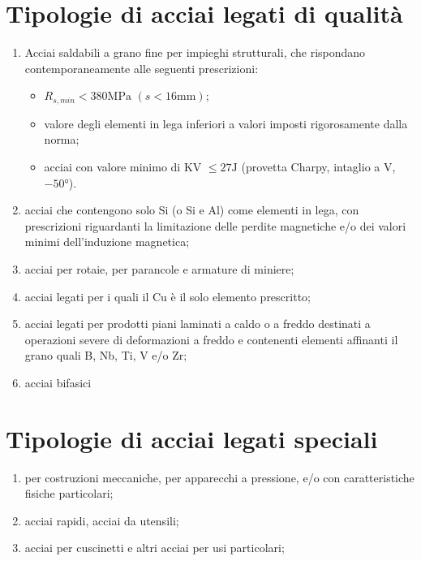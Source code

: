 \section{Tipologie di acciai legati di qualità}\label{sec:ALDQ}
\begin{enumerate}
\item Acciai saldabili a grano fine per impieghi strutturali, che rispondano contemporaneamente alle seguenti prescrizioni:
	\begin{itemize}
	\item $R_{s,min} < 380\unit{\MPa}$ $(s < 16\unit{\mm})$;
	\item valore degli elementi in lega inferiori a valori imposti rigorosamente dalla norma;
	\item acciai con valore minimo di KV $\leq 27\unit{\J}$ (provetta Charpy, intaglio a V, $-50\unit{\degree}$).
	\end{itemize}
\item acciai che contengono solo Si (o Si e Al) come elementi in lega, con prescrizioni riguardanti la limitazione delle perdite magnetiche e/o dei valori minimi dell'induzione magnetica;
\item acciai per rotaie, per parancole e armature di miniere;
\item acciai legati per i quali il Cu è il solo elemento prescritto;
\item acciai legati per prodotti piani laminati a caldo o a freddo destinati a operazioni severe di deformazioni a freddo e contenenti elementi affinanti il grano quali B, Nb, Ti, V e/o Zr;
\item acciai bifasici
\end{enumerate}

\section{Tipologie di acciai legati speciali}\label{sec:ALS}
\begin{enumerate}
\item per costruzioni meccaniche, per apparecchi a pressione, e/o con caratteristiche fisiche particolari;
\item acciai rapidi, acciai da utensili;
\item acciai per cuscinetti e altri acciai per usi particolari;
\end{enumerate}
